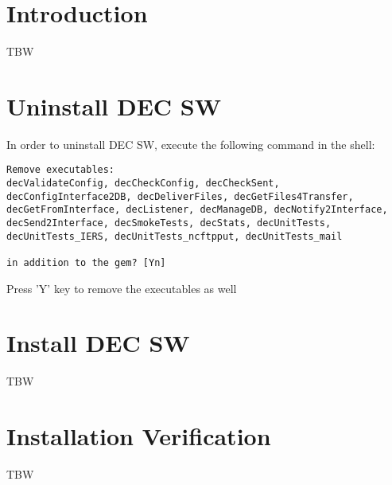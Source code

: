 \documentclass[dec_sum_main.tex]{subfiles}
\begin{document}
\section{Introduction}
TBW 

\section{Uninstall DEC SW}

In order to uninstall DEC SW, execute the following command in the shell:
\par 
{}
\par 

\begin{verbatim}
Remove executables:
decValidateConfig, decCheckConfig, decCheckSent, decConfigInterface2DB, decDeliverFiles, decGetFiles4Transfer, decGetFromInterface, decListener, decManageDB, decNotify2Interface, decSend2Interface, decSmokeTests, decStats, decUnitTests, decUnitTests_IERS, decUnitTests_ncftpput, decUnitTests_mail

in addition to the gem? [Yn]
\end{verbatim}

Press 'Y' key to remove the executables as well


\section{Install DEC SW}

TBW


\section{Installation Verification}
TBW
\end{document}
